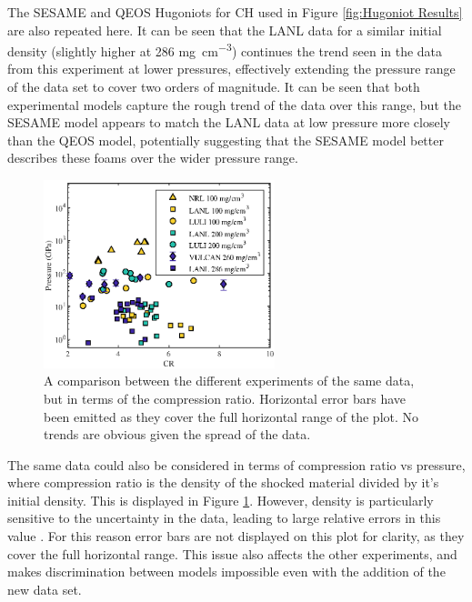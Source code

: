 The SESAME and QEOS Hugoniots for CH used in Figure \ref{fig:Hugoniot Results} are also repeated here. It can be seen that the LANL data for a similar initial density (slightly higher at 286 \unit{\milli\gram\per\centi\meter\cubed}) continues the trend seen in the data from this experiment at lower pressures, effectively extending the pressure range of the data set to cover two orders of magnitude. It can be seen that both experimental models capture the rough trend of the data over this range, but the SESAME model appears to match the LANL data at low pressure more closely than the QEOS model, potentially suggesting that the SESAME model better describes these foams over the wider pressure range.

\begin{figure} [h!]
\begin{centering}
\includegraphics[width=0.6\textwidth]{figures/Experiment/OtherDataCR.eps}%
\caption{\label{fig:Other Foam Data CR} A comparison between the different experiments of the same data, but in terms of the compression ratio. Horizontal error bars have been emitted as they cover the full horizontal range of the plot. No trends are obvious given the spread of the data. }
\end{centering}
\end{figure}

The same data could also be considered in terms of compression ratio vs pressure, where compression ratio is the density of the shocked material divided by it's initial density. This is displayed in Figure \ref{fig:Other Foam Data CR}. However, density is particularly sensitive to the uncertainty in the data, leading to large relative errors in this value \cite{LePape2008}. For this reason error bars are not displayed on this plot for clarity, as they cover the full horizontal range. This issue also affects the other experiments, and makes discrimination between models impossible even with the addition of the new data set.











